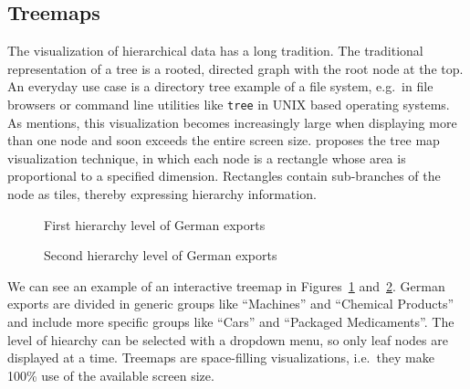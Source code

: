 \documentclass{article}
\begin{document}
\subsection{Treemaps}
The visualization of hierarchical data has a long tradition.
The traditional representation of a tree is a rooted, directed graph with the root node at the top.
An everyday use case is a directory tree example of a file system, e.g.\ in file browsers or command line utilities like \texttt{tree} in UNIX based operating systems.
As \textcite{Shneiderman1992} mentions, this visualization becomes increasingly large when displaying more than one node and soon exceeds the entire screen size.
\textcite{Johnson1991} proposes the tree map visualization technique, in which each node is a rectangle whose area is proportional to a specified dimension.
Rectangles contain sub-branches of the node as tiles, thereby expressing hierarchy information.
\begin{figure}[h]
    \centering
    \caption{First hierarchy level of German exports}\label{fig:theory:treemap-german-exports-1}
\end{figure}

\begin{figure}[h]
    \centering
    \caption{Second hierarchy level of German exports}\label{fig:theory:treemap-german-exports-2}
\end{figure}
We can see an example of an interactive treemap in Figures~\ref{fig:theory:treemap-german-exports-1} and~\ref{fig:theory:treemap-german-exports-2}.
German exports are divided in generic groups like ``Machines'' and ``Chemical Products'' and include more specific groups like ``Cars'' and ``Packaged Medicaments''.
The level of hiearchy can be selected with a dropdown menu, so only leaf nodes are displayed at a time.
Treemaps are space-filling visualizations, i.e.\ they make 100\% use of the available screen size.
\end{document}
